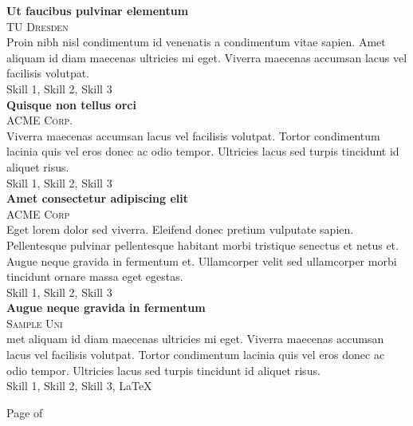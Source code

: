 \documentclass[onside]{article}
\begin{document}
{\begin{minipage}[t][\dimexpr\textheight-2\fboxrule-2\fboxsep\relax][t]{\dimexpr0.6\textwidth-2\fboxrule-2\fboxsep\relax}
\begin{justify}
        {\large \textbf{Ut faucibus pulvinar elementum}} \\
        {\scshape{}\selectfont\footnotesize TU Dresden } \\
        Proin nibh nisl condimentum id venenatis a condimentum vitae sapien. Amet aliquam id diam maecenas ultricies mi eget. Viverra maecenas accumsan lacus vel facilisis volutpat. \\[1ex]
        Skill 1, Skill 2, Skill 3 \\

        {\large \textbf{Quisque non tellus orci}} \\
        {\scshape{}\selectfont\footnotesize ACME Corp. } \\
        Viverra maecenas accumsan lacus vel facilisis volutpat. Tortor condimentum lacinia quis vel eros donec ac odio tempor. Ultricies lacus sed turpis tincidunt id aliquet risus. \\[1ex]
        Skill 1, Skill 2, Skill 3 \\
        
        {\large \textbf{Amet consectetur adipiscing elit}} \\
        {\scshape{}\selectfont\footnotesize ACME Corp } \\
        Eget lorem dolor sed viverra. Eleifend donec pretium vulputate sapien. Pellentesque pulvinar pellentesque habitant morbi tristique senectus et netus et. Augue neque gravida in fermentum et. Ullamcorper velit sed ullamcorper morbi tincidunt ornare massa eget egestas. \\[1ex]
        Skill 1, Skill 2, Skill 3 \\
        
        {\large \textbf{Augue neque gravida in fermentum}} \\
        {\scshape{}\selectfont\footnotesize Sample Uni } \\
        met aliquam id diam maecenas ultricies mi eget. Viverra maecenas accumsan lacus vel facilisis volutpat. Tortor condimentum lacinia quis vel eros donec ac odio tempor. Ultricies lacus sed turpis tincidunt id aliquet risus. \\[1ex]
        Skill 1, Skill 2, Skill 3, \LaTeX 
        \end{justify}
        \vfill%
        {\hfill\small{}\selectfont Page \thepage of \pageref{LastPage}\hfill}
    \end{minipage}
}
\end{document}
